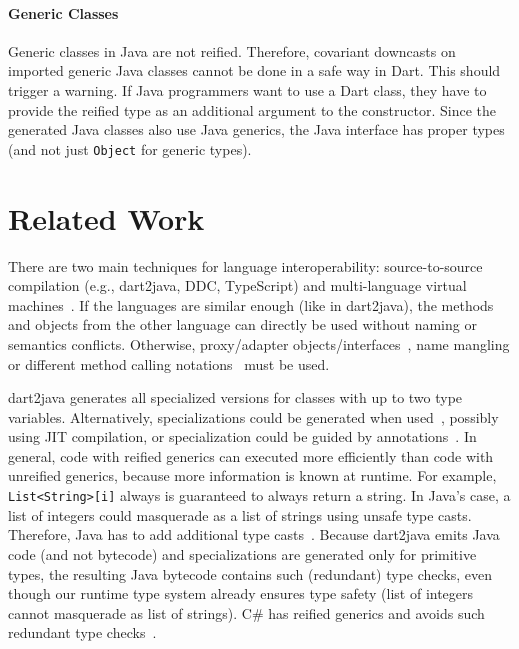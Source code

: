 \documentclass[sigplan,9pt]{acmart}
\begin{document}
\paragraph{Generic Classes}
Generic classes in Java are not reified. Therefore, covariant downcasts on imported generic Java classes cannot be done in a safe way in Dart. This should trigger a warning. If Java programmers want to use a Dart class, they have to provide the reified type as an additional argument to the constructor. Since the generated Java classes also use Java generics, the Java interface has proper types (and not just \texttt{Object} for generic types).


\section{Related Work}
There are two main techniques for language interoperability: source-to-source compilation (e.g., dart2java, DDC, TypeScript) and multi-language virtual machines~\cite{multivm_saarlang, vranythesis}. If the languages are similar enough (like in dart2java), the methods and objects from the other language can directly be used without naming or semantics conflicts. Otherwise, proxy/adapter objects/interfaces~\cite{DBLP:journals/jot/EkmanMS07}, name mangling or different method calling notations~\cite{DBLP:journals/corr/Springer16} must be used. 

dart2java generates all specialized versions for classes with up to two type variables. Alternatively, specializations could be generated when used~\cite{Kennedy:2001:DIG:378795.378797}, possibly using JIT compilation, or specialization could be guided by annotations~\cite{Dragos:2009:CGT:1565824.1565830}. In general, code with reified generics can executed more efficiently than code with unreified generics, because more information is known at runtime. For example, \texttt{List<String>[i]} always is guaranteed to always return a string. In Java's case, a list of integers could masquerade as a list of strings using unsafe type casts. Therefore, Java has to add additional type casts~\cite{Nino:2007:CEJ:1229688.1229690, BrachaJuly52004}. Because dart2java emits Java code (and not bytecode) and specializations are generated only for primitive types, the resulting Java bytecode contains such (redundant) type checks, even though our runtime type system already ensures type safety (list of integers cannot masquerade as list of strings). C\# has reified generics and avoids such redundant type checks~\cite{Kennedy:2001:DIG:378795.378797}.
\end{document}
